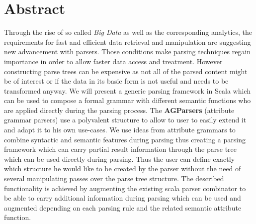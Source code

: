 \section{Abstract}
Through the rise of so called \emph{Big Data} as well as the corresponding analytics, the requirements for fast and efficient data retrieval and manipulation are suggesting new advancement with parsers. Those conditions make parsing techniques regain importance in order to allow faster data access and treatment. However constructing parse trees can be expensive as not all of the parsed content might be of interest or if the data in its basic form is not useful and needs to be transformed anyway.
We will present a generic parsing framework in Scala which can be used to compose a formal grammar with different semantic functions who are applied directly during the parsing process. The \textbf{AGParsers} (attribute grammar parsers) use a polyvalent structure to allow to user to easily extend it and adapt it to his own use-cases.
We use ideas from attribute grammars to combine syntactic and semantic features during parsing thus creating a parsing framework which can carry partial result information through the parse tree which can be used directly during parsing. Thus the user can define exactly which structure he would like to be created by the parser without the need of several manipulating passes over the parse tree structure.
The described functionality is achieved by augmenting the existing scala parser combinator to be able to carry additional information during parsing which can be used and augmented depending on each parsing rule and the related semantic attribute function.

